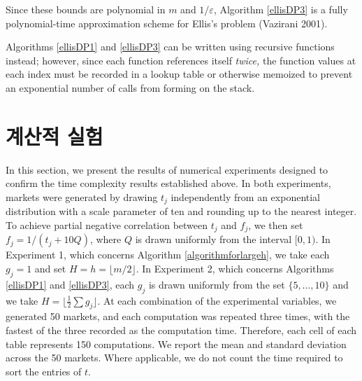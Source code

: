 \documentclass[12pt]{article} %
\newif\ifen
\theoremstyle{definition}
\theoremstyle{definition}
\begin{document}
Since these bounds are polynomial in $m$ and $1 / \varepsilon$, Algorithm \ref{ellisDP3} is a fully polynomial-time approximation scheme for Ellis's problem (Vazirani 2001). 

Algorithms \ref{ellisDP1} and \ref{ellisDP3} can be written using recursive functions instead; however, since each function references itself \emph{twice,} the function values at each index must be recorded in a lookup table or otherwise memoized to prevent an exponential number of calls from forming on the stack.



\pagebreak
\ifen \section{(WIP) Numerical experiments} \else \section{계산적 실험}\fi\label{numericalexperiments}
In this section, we present the results of numerical experiments designed to confirm the time complexity results established above. In both experiments, markets were generated by drawing $t_j$ independently from an exponential distribution with a scale parameter of ten and rounding up to the nearest integer. To achieve partial negative correlation between $t_j$ and $f_j$, we then set $f_j = 1 / (t_j + 10 Q)$, where $Q$ is drawn uniformly from the interval $[0, 1)$. In Experiment 1, which concerns Algorithm \ref{algorithmforlargeh}, we take each $g_j = 1$ and set $H = h = \lfloor m/ 2 \rfloor$. In Experiment 2, which concerns Algorithms \ref{ellisDP1} and \ref{ellisDP3}, each $g_j$ is drawn uniformly from the set $\{5, \dots, 10\}$ and we take $H = \lfloor \frac{1}{2} \sum g_j \rfloor$. At each combination of the experimental variables, we generated 50 markets, and each computation was repeated three times, with the fastest of the three  recorded as the computation time. Therefore, each cell of each table represents 150 computations. We report the mean and standard deviation across the 50 markets. Where applicable, we do not count the time required to sort the entries of $t$.
\end{document}

